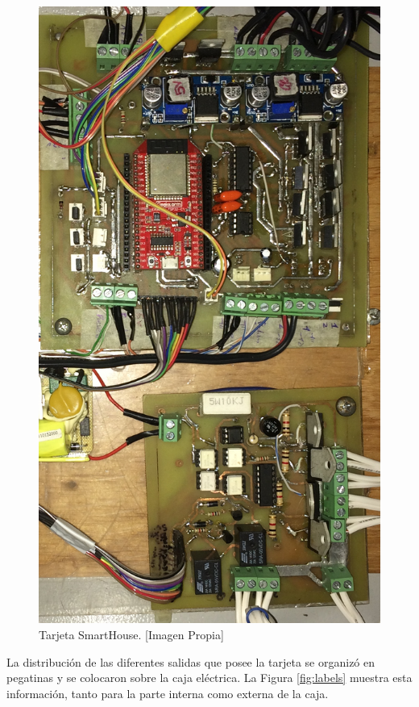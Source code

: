 \begin{figure}[H]
	\centering
	\caption[Tarjeta SmartHouse.]{Tarjeta SmartHouse. [Imagen Propia]}
	\label{fig:tarjeta}
	\includegraphics[width=0.6\linewidth]{Imagenes/Tarjeta.jpg}
\end{figure}

La distribución de las diferentes salidas que posee la tarjeta se organizó en pegatinas y se colocaron sobre la caja eléctrica. La Figura \ref{fig:labels} muestra esta información, tanto para la parte interna como externa de la caja.\\

